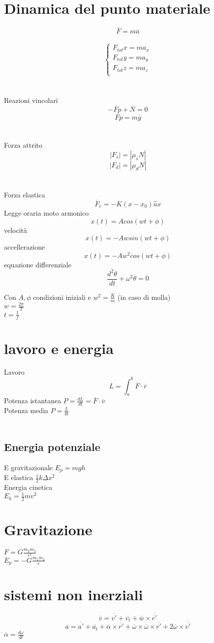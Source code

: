 \documentclass{article}
\begin{document}
\section{Dinamica del punto materiale}
\[\overline{F} = m\overline{a}\]\\
\[
\begin{cases}
	F_{tot} x = ma_x \\
	F_{tot} y = ma_y   \\
	F_{tot} z = ma_z   \\
\end{cases}
\]\\\\
\large{Reazioni vincolari}
\[-\overline{F}p + \overline{N} = 0\]
\[\overline{F}p = m\overline{g}\]
\\\\
\large{Forza attrito}
\[|F_s| = |\mu_sN|\]
\[|F_d| = |\mu_dN|\]
\\\\
\large{Forza elastica}
\[\overline{F}_e = -K(x-x_0)\hat{u}x\]
\large{Legge oraria moto armonico}
\[x(t) = A cos(wt + \phi)\]
velocità
\[x(t) = -Aw sin(wt + \phi)\]
accellerazione
\[x(t) = -Aw^2 cos(wt + \phi)\]
equazione differenziale
\[\frac{d^2\theta}{dt}+\omega^2\theta=0\]

Con \(A, \phi\) condizioni iniziali e \(w^2 = \frac{K}{m}\) (in caso di molla)\\
\(w=\frac{2\pi}{T}\)\\
\(t=\frac{1}{f}\)\\
\section{lavoro e energia}
Lavoro
\[L=\int_{a}^{b}\overline{F}\cdot\overline{r}\]
Potenza istantanea \(P=\frac{dL}{dt}=\overline{F}\cdot\overline{v}\)\\
Potenza media \(P=\frac{L}{\delta t}\)\\\\
\subsection{Energia potenziale}
E gravitazionale \(E_p = mgh\)\\
E elastica \(\frac{1}{2}k\Delta x^2\)\\
\Large{Energia cinetica}\\
\(E_k= \frac{1}{2}mv^2\)
\section{Gravitazione}
\(F=G\frac{m_{2} m_{2}}{r^2}\)\\
\(E_p=-G\frac{m_{1}m_{2}}{r}\)
\section{sistemi non inerziali}
\[\overline{v}=\overline{v'}+\overline{v_t}+\overline{w}\times\overline{r'}\]
\[\overline{a}=\overline{a'}+\overline{a_t}+\overline{\alpha}\times\overline{r'}+\overline{\omega}\times\overline{\omega}\times\overline{r'}+2\overline{\omega}\times\overline{v'}\]
\(\overline{\alpha}=\frac{d\omega}{dt}\)
\end{document}
